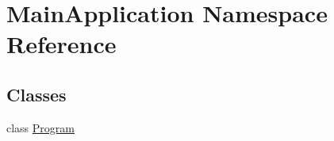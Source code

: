 \hypertarget{namespace_main_application}{}\section{Main\+Application Namespace Reference}
\label{namespace_main_application}
\subsection*{Classes}
\begin{DoxyCompactItemize}
\item 
class \hyperlink{class_main_application_1_1_program}{Program}
\end{DoxyCompactItemize}
